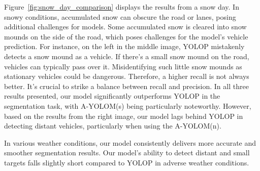 \documentclass[lettersize,journal]{IEEEtran}
\begin{document}
Figure~\ref{fig:snow_day_comparison} displays the results from a snow day. In snowy conditions, accumulated snow can obscure the road or lanes, posing additional challenges for models. Some accumulated snow is cleared into snow mounds on the side of the road, which poses challenges for the model's vehicle prediction. For instance, on the left in the middle image, YOLOP mistakenly detects a snow mound as a vehicle. If there's a small snow mound on the road, vehicles can typically pass over it. Misidentifying such little snow mounds as stationary vehicles could be dangerous. Therefore, a higher recall is not always better. It's crucial to strike a balance between recall and precision. In all three results presented, our model significantly outperforms YOLOP in the segmentation task, with A-YOLOM(s) being particularly noteworthy. However, based on the results from the right image, our model lags behind YOLOP in detecting distant vehicles, particularly when using the A-YOLOM(n).

In various weather conditions, our model consistently delivers more accurate and smoother segmentation results. Our model's ability to detect distant and small targets falls slightly short compared to YOLOP in adverse weather conditions.
\end{document}

